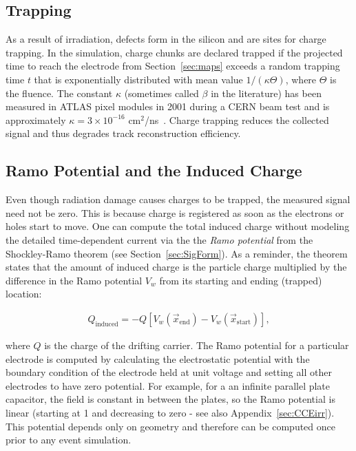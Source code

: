 \subsection{Trapping}
\label{sec:chargetrapping}

As a result of irradiation, defects form in the silicon and are sites for charge trapping.  In the simulation, charge chunks are declared trapped if the projected time to reach the electrode from Section~\ref{sec:maps} exceeds a random trapping time $t$ that is exponentially distributed with mean value $1/(\kappa\Theta)$, where $\Theta$ is the fluence.  The constant $\kappa$ (sometimes called $\beta$ in the literature) has been measured in ATLAS pixel modules in  2001 during a CERN  beam test and is approximately $\kappa=3\times 10^{-16}$ cm${}^2$/ns~\cite{trapping2}.  Charge trapping reduces the collected signal and thus degrades track reconstruction efficiency.

\subsection{Ramo Potential and the Induced Charge}
\label{sec:ramo}

Even though radiation damage causes charges to be trapped, the measured signal need not be zero.  This is because charge is registered as soon as the electrons or holes start to move.  One can compute the total induced charge without modeling the detailed time-dependent current via the the \textit{Ramo potential} from the Shockley-Ramo theorem (see Section~\ref{sec:SigForm}).  As a reminder, the theorem states that the amount of induced charge is the particle charge multiplied by the difference in the Ramo potential $V_w$ from its starting and ending (trapped) location:

\begin{align}
\label{eq:ramo}
Q_\text{induced} = -Q[V_w(\vec{x}_\text{end})-V_w(\vec{x}_\text{start})],
\end{align}

where $Q$ is the charge of the drifting carrier.  The Ramo potential for a particular electrode is computed by calculating the electrostatic potential with the boundary condition of the electrode held at unit voltage and setting all other electrodes to have zero potential.  For example, for a an infinite parallel plate capacitor, the field is constant in between the plates, so the Ramo potential is linear (starting at 1 and decreasing to zero
 - see also Appendix~\ref{sec:CCEirr}).  This potential depends only on geometry and therefore can be computed once prior to any event simulation.   

